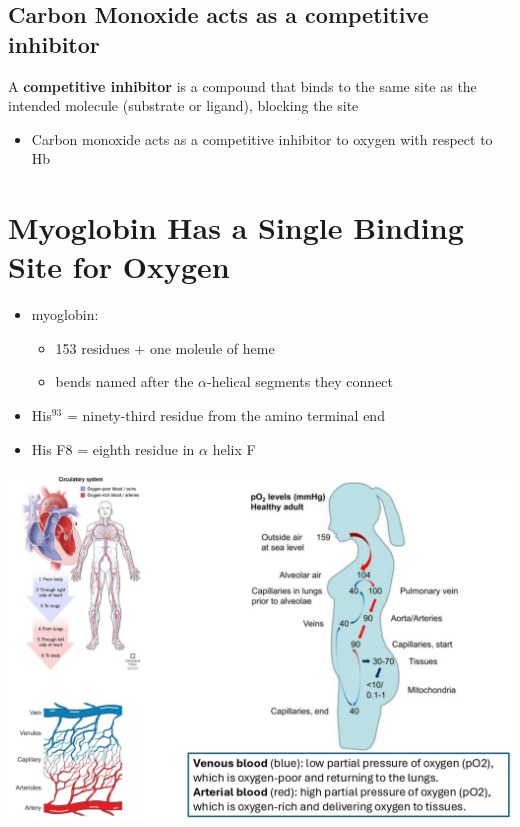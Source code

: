 \documentclass[10pt]{article}
\begin{document}
\subsection*{Carbon Monoxide acts as a competitive inhibitor}
A \textbf{competitive inhibitor} is a compound that binds to the same site as the intended molecule (substrate or ligand), blocking the site
\begin{itemize}
    \item Carbon monoxide acts as a competitive inhibitor to oxygen with respect to Hb
\end{itemize}

\section*{Myoglobin Has a Single Binding Site for Oxygen}
\begin{itemize}
    \item myoglobin:
    \begin{itemize}
        \item 153 residues + one moleule of heme
        \item bends named after the $\alpha$-helical segments they connect
    \end{itemize}
    \item His$^{93}$ = ninety-third residue from the amino terminal end
    \item His F8 = eighth residue in $\alpha$ helix F    
\end{itemize}

\begin{center}
    \includegraphics*[width=\textwidth]{L2_5.png}
\end{center}
\end{document}
